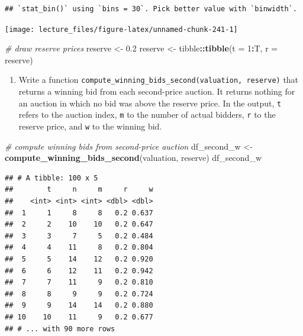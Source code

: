 \documentclass[]{book}
\newenvironment{Shaded}{\begin{snugshade}}{\end{snugshade}}
\newcommand{\KeywordTok}[1]{\textcolor[rgb]{0.13,0.29,0.53}{\textbf{#1}}}
\newcommand{\DataTypeTok}[1]{\textcolor[rgb]{0.13,0.29,0.53}{#1}}
\newcommand{\DecValTok}[1]{\textcolor[rgb]{0.00,0.00,0.81}{#1}}
\newcommand{\FloatTok}[1]{\textcolor[rgb]{0.00,0.00,0.81}{#1}}
\newcommand{\StringTok}[1]{\textcolor[rgb]{0.31,0.60,0.02}{#1}}
\newcommand{\CommentTok}[1]{\textcolor[rgb]{0.56,0.35,0.01}{\textit{#1}}}
\newcommand{\OperatorTok}[1]{\textcolor[rgb]{0.81,0.36,0.00}{\textbf{#1}}}
\newcommand{\NormalTok}[1]{#1}
\providecommand{\tightlist}{%
  \setlength{\itemsep}{0pt}\setlength{\parskip}{0pt}}
\begin{document}
\begin{verbatim}
## `stat_bin()` using `bins = 30`. Pick better value with `binwidth`.
\end{verbatim}

\begin{center}\texttt{[image: lecture\_files/figure-latex/unnamed-chunk-241-1]} \end{center}

\begin{Shaded}
\begin{Highlighting}[]
\CommentTok{# draw reserve prices}
\NormalTok{reserve <-}\StringTok{ }\FloatTok{0.2}
\NormalTok{reserve <-}\StringTok{ }\NormalTok{tibble}\OperatorTok{::}\KeywordTok{tibble}\NormalTok{(}\DataTypeTok{t =} \DecValTok{1}\OperatorTok{:}\NormalTok{T, }\DataTypeTok{r =}\NormalTok{ reserve)}
\end{Highlighting}
\end{Shaded}

\begin{enumerate}
\def\labelenumi{\arabic{enumi}.}
\setcounter{enumi}{2}
\tightlist
\item
  Write a function
  \texttt{compute\_winning\_bids\_second(valuation,\ reserve)} that
  returns a winning bid from each second-price auction. It returns
  nothing for an auction in which no bid was above the reserve price. In
  the output, \texttt{t} refers to the auction index, \texttt{m} to the
  number of actual bidders, \texttt{r} to the reserve price, and
  \texttt{w} to the winning bid.
\end{enumerate}

\begin{Shaded}
\begin{Highlighting}[]
\CommentTok{# compute winning bids from second-price auction}
\NormalTok{df_second_w <-}
\StringTok{  }\KeywordTok{compute_winning_bids_second}\NormalTok{(valuation, reserve)}
\NormalTok{df_second_w}
\end{Highlighting}
\end{Shaded}

\begin{verbatim}
## # A tibble: 100 x 5
##        t     n     m     r     w
##    <int> <int> <int> <dbl> <dbl>
##  1     1     8     8   0.2 0.637
##  2     2    10    10   0.2 0.647
##  3     3     7     5   0.2 0.484
##  4     4    11     8   0.2 0.804
##  5     5    14    12   0.2 0.920
##  6     6    12    11   0.2 0.942
##  7     7    11     9   0.2 0.810
##  8     8     9     9   0.2 0.724
##  9     9    14    14   0.2 0.880
## 10    10    11     9   0.2 0.677
## # ... with 90 more rows
\end{verbatim}
\end{document}
